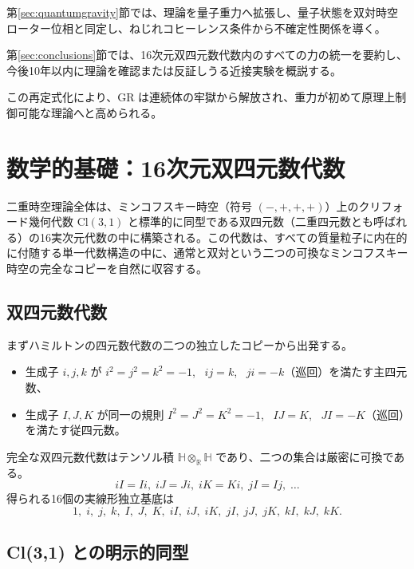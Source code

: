 \documentclass[dvipdfmx,a4paper]{article}
\begin{document}
第\ref{sec:quantumgravity}節では、理論を量子重力へ拡張し、量子状態を双対時空ローター位相と同定し、ねじれコヒーレンス条件から不確定性関係を導く。

第\ref{sec:conclusions}節では、16次元双四元数代数内のすべての力の統一を要約し、今後10年以内に理論を確認または反証しうる近接実験を概説する。

この再定式化により、GR は連続体の牢獄から解放され、重力が初めて原理上制御可能な理論へと高められる。

\section{数学的基礎：16次元双四元数代数}
\label{sec:math}

二重時空理論全体は、ミンコフスキー時空（符号 $(-,+,+,+)$）上のクリフォード幾何代数 $\mathrm{Cl}(3,1)$ と標準的に同型である双四元数（二重四元数とも呼ばれる）の16実次元代数の中に構築される。この代数は、すべての質量粒子に内在的に付随する単一代数構造の中に、通常と双対という二つの可換なミンコフスキー時空の完全なコピーを自然に収容する。

\subsection{双四元数代数}

まずハミルトンの四元数代数の二つの独立したコピーから出発する。
\begin{itemize}
  \item 生成子 $i,j,k$ が $i^2=j^2=k^2=-1$, \ $ij=k$, \ $ji=-k$（巡回）を満たす主四元数、
  \item 生成子 $I,J,K$ が同一の規則 $I^2=J^2=K^2=-1$, \ $IJ=K$, \ $JI=-K$（巡回）を満たす従四元数。
\end{itemize}
完全な双四元数代数はテンソル積 $\mathbb{H} \otimes_{\mathbb{R}} \mathbb{H}$ であり、二つの集合は厳密に可換である。
\[
iI = Ii,\; iJ = Ji,\; iK = Ki,\; jI = Ij,\; \dots
\]
得られる16個の実線形独立基底は
\[
1,\; i,\; j,\; k,\; I,\; J,\; K,\; iI,\; iJ,\; iK,\; jI,\; jJ,\; jK,\; kI,\; kJ,\; kK.
\]

\subsection{Cl(3,1) との明示的同型}
\end{document}
